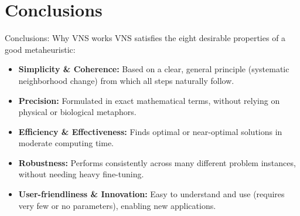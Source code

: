 \documentclass{beamer}
\begin{document}

\section{Conclusions}

\begin{frame}{Conclusions: Why VNS works}
\quad VNS satisfies the eight desirable properties of a good metaheuristic:

\vspace{0.25cm}
\begin{itemize}
\item \textbf{Simplicity \& Coherence:} Based on a clear, general principle (systematic neighborhood change) from which all steps naturally follow.
\vspace{0.15cm}
\item \textbf{Precision:} Formulated in exact mathematical terms, without relying on physical or biological metaphors.
\vspace{0.15cm}
\item \textbf{Efficiency \& Effectiveness:} Finds optimal or near-optimal solutions in moderate computing time.
\vspace{0.15cm}
\item \textbf{Robustness:} Performs consistently across many different problem instances, without needing heavy fine-tuning.
\vspace{0.15cm}
\item \textbf{User-friendliness \& Innovation:} Easy to understand and use (requires very few or no parameters), enabling new applications.
\end{itemize}
\end{frame}
\end{document}
